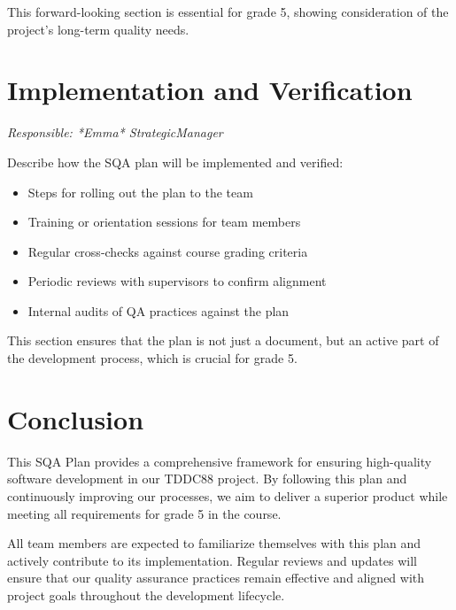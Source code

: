 \documentclass{article}
\begin{document}
This forward-looking section is essential for grade 5, showing consideration of the project's long-term quality needs.

\section{Implementation and Verification}
\textit{Responsible: *Emma* StrategicManager}

Describe how the SQA plan will be implemented and verified:

\begin{itemize}
    \item Steps for rolling out the plan to the team
    \item Training or orientation sessions for team members
    \item Regular cross-checks against course grading criteria
    \item Periodic reviews with supervisors to confirm alignment
    \item Internal audits of QA practices against the plan
\end{itemize}

This section ensures that the plan is not just a document, but an active part of the development process, which is crucial for grade 5.

\section{Conclusion}
This SQA Plan provides a comprehensive framework for ensuring high-quality software development in our TDDC88 project. By following this plan and continuously improving our processes, we aim to deliver a superior product while meeting all requirements for grade 5 in the course.

All team members are expected to familiarize themselves with this plan and actively contribute to its implementation. Regular reviews and updates will ensure that our quality assurance practices remain effective and aligned with project goals throughout the development lifecycle.
\end{document}
